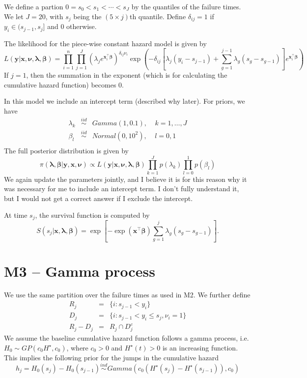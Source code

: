 \documentclass[12pt]{article}
\newcommand{\m}[1]{\mathbf{\bm{#1}}}
\begin{document}
\noindent We define a partion $0=s_0 < s_1 < \cdots < s_J$ by the quantiles of the failure times. We let $J=20$, with $s_j$ being the $(5\times j)$th quantile. Define $\delta_{ij}=1$ if $y_i\in(s_{j-1},s_j]$ and $0$ otherwise.
\bigskip

\noindent The likelihood for the piece-wise constant hazard model is given by
\[ L(\m{y}|\m{x},\m{\nu},\m{\lambda},\m{\beta}) = \prod_{i=1}^n\prod_{j=1}^J(\lambda_j e^{\m{x}_i^\top\m{\beta}})^{\delta_{ij}\nu_i}\exp\left(-\delta_{ij}\left[\lambda_j(y_i-s_{j-1})+\sum_{g=1}^{j-1}\lambda_g(s_g-s_{g-1})\right]e^{\m{x}_i^\top\m{\beta}}\right) \]
\noindent If $j=1$, then the summation in the exponent (which is for calculating the cumulative hazard function) becomes 0.
\bigskip

\noindent In this model we include an intercept term (described why later). For priors, we have
\begin{eqnarray*}
\lambda_k &\overset{iid}\sim& Gamma(1, 0.1),~~~~~k=1,\ldots,J \\
\beta_l &\overset{iid}\sim& Normal(0, 10^2),~~~~~l=0,1 \\
\end{eqnarray*}
\noindent 
\noindent The full posterior distribution is given by
\[ \pi(\m{\lambda}, \m{\beta}|\m{y},\m{x},\m{\nu}) \propto L(\m{y}|\m{x},\m{\nu},\m{\lambda},\m{\beta}) \prod_{k=1}^J p(\lambda_k) \prod_{l=0}^1 p(\beta_l) \]
\noindent We again update the parameters jointly, and I believe it is for this reason why it was necessary for me to include an intercept term. I don't fully understand it, but I would not get a correct answer if I exclude the intercept.
\bigskip

\noindent At time $s_j$, the survival function is computed by
\[ S(s_j|\m{x},\m{\lambda},\m{\beta})=\exp\left[-\exp\left(\m{x}^\top\m{\beta}\right)\sum_{g=1}^j\lambda_g(s_g-s_{g-1})\right]. \]

\section*{M3 -- Gamma process}

\noindent We use the same partition over the failure times as used in M2. We further define
\begin{eqnarray*}
    R_j &=& \{i:s_{j-1}<y_i\} \\
    D_j &=& \{i:s_{j-1}<y_i\leq s_j,\nu_i=1 \} \\
R_j-D_j &=& R_j \cap D_j^c
\end{eqnarray*}
\noindent We assume the baseline cumulative hazard function follows a gamma process, i.e. $H_0\sim GP(c_0 H^\star, c_0)$, where $c_0>0$ and $H^\star(t)>0$ is an increasing function. This implies the following prior for the jumps in the cumulative hazard
\[ h_j=H_0(s_j)-H_0(s_{j-1})\overset{ind}\sim Gamma(c_0(H^\star(s_j) - H^\star(s_{j-1})), c_0) \]
\end{document}
